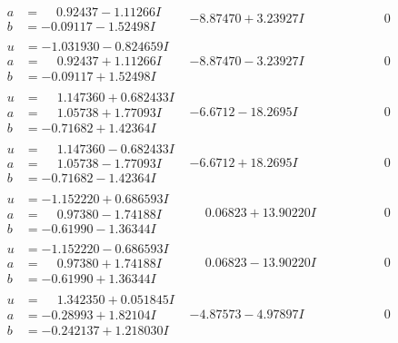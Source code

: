 \documentclass[1p]{elsarticle_modified}
\theoremstyle{definition}
\begin{document}
$$\begin{array}{c|c|c}
\begin{aligned}
a &= \phantom{-}0.92437 - 1.11266 I \\
b &= -0.09117 - 1.52498 I\end{aligned}
 & -8.87470 + 3.23927 I & \phantom{-0.000000 } 0 \\ \hline\begin{aligned}
u &= -1.031930 - 0.824659 I \\
a &= \phantom{-}0.92437 + 1.11266 I \\
b &= -0.09117 + 1.52498 I\end{aligned}
 & -8.87470 - 3.23927 I & \phantom{-0.000000 } 0 \\ \hline\begin{aligned}
u &= \phantom{-}1.147360 + 0.682433 I \\
a &= \phantom{-}1.05738 + 1.77093 I \\
b &= -0.71682 + 1.42364 I\end{aligned}
 & -6.6712 - 18.2695 I & \phantom{-0.000000 } 0 \\ \hline\begin{aligned}
u &= \phantom{-}1.147360 - 0.682433 I \\
a &= \phantom{-}1.05738 - 1.77093 I \\
b &= -0.71682 - 1.42364 I\end{aligned}
 & -6.6712 + 18.2695 I & \phantom{-0.000000 } 0 \\ \hline\begin{aligned}
u &= -1.152220 + 0.686593 I \\
a &= \phantom{-}0.97380 - 1.74188 I \\
b &= -0.61990 - 1.36344 I\end{aligned}
 & \phantom{-}0.06823 + 13.90220 I & \phantom{-0.000000 } 0 \\ \hline\begin{aligned}
u &= -1.152220 - 0.686593 I \\
a &= \phantom{-}0.97380 + 1.74188 I \\
b &= -0.61990 + 1.36344 I\end{aligned}
 & \phantom{-}0.06823 - 13.90220 I & \phantom{-0.000000 } 0 \\ \hline\begin{aligned}
u &= \phantom{-}1.342350 + 0.051845 I \\
a &= -0.28993 + 1.82104 I \\
b &= -0.242137 + 1.218030 I\end{aligned}
 & -4.87573 - 4.97897 I & \phantom{-0.000000 } 0 \\ \hline\begin{aligned}

\end{aligned}
\end{array}$$
\end{document}
